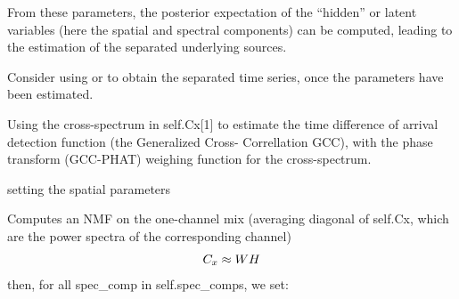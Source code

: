 \documentclass[letterpaper,10pt,english]{sphinxmanual}
\begin{document}
\begin{fulllineitems}
\begin{fulllineitems}
From these parameters, the posterior expectation of the
``hidden'' or latent variables (here the spatial and spectral
components) can be computed, leading to the estimation of the
separated underlying sources.

Consider using  or
 to obtain the separated time
series, once the parameters have been estimated.

\end{fulllineitems}


\begin{fulllineitems}
\label{reference/audiomodel:pyfasst.audioModel.FASST.gcc_phat_tdoa_2d}
Using the cross-spectrum in self.Cx{[}1{]} to estimate the time
difference of arrival detection function (the Generalized Cross-
Correllation GCC), with the phase transform (GCC-PHAT) weighing
function for the cross-spectrum.

\end{fulllineitems}


\begin{fulllineitems}
\label{reference/audiomodel:pyfasst.audioModel.FASST.initializeConvParams}
setting the spatial parameters

\end{fulllineitems}


\begin{fulllineitems}
\label{reference/audiomodel:pyfasst.audioModel.FASST.initialize_all_spec_comps_with_NMF}
Computes an NMF on the one-channel mix (averaging diagonal
of self.Cx, which are the power spectra of the corresponding
channel)
\begin{gather}
\begin{split}C_x \approx W H\end{split}\notag
\end{gather}
then, for all spec\_comp in self.spec\_comps, we set:


\end{fulllineitems}
\end{fulllineitems}
\end{document}
